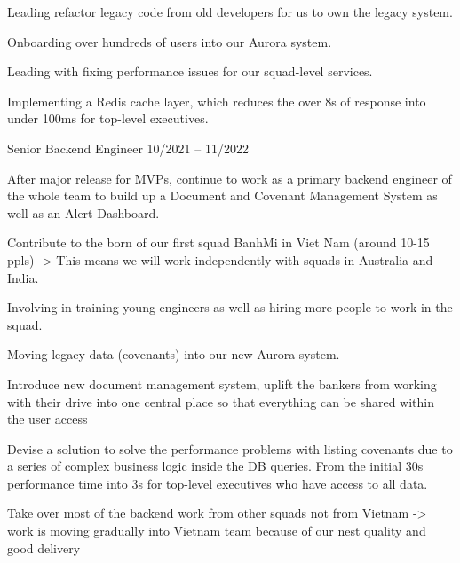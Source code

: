 \begin{cventries}
{\begin{cvitems}
            \item {Leading refactor legacy code from old developers for us to own the legacy system.}
            \item {Onboarding over hundreds of users into our Aurora system.}
            \item {Leading with fixing performance issues for our squad-level services.}
            \item {Implementing a Redis cache layer, which reduces the over 8s of response into under 100ms for top-level executives.}
        \end{cvitems}
    }

    
    \cventry
    {Senior Backend Engineer} %
    {} %
    {} %
    {10/2021 -- 11/2022} %
    {
        \begin{cvitems} %
            \item{After major release for MVPs, continue to work as a primary backend engineer of the whole team to build up a Document and Covenant Management System as well as an Alert Dashboard.}
            \item {Contribute to the born of our first squad BanhMi in Viet Nam (around 10-15 ppls) -> This means we will work independently with squads in Australia and India.}
            \item {Involving in training young engineers as well as hiring more people to work in the squad.}
            \item {Moving legacy data (covenants) into our new Aurora system.}
            \item {Introduce new document management system, uplift the bankers from working with their drive into one central place so that everything can be shared within the user access}
            \item {Devise a solution to solve the performance problems with listing covenants due to a series of complex business logic inside the DB queries. From the initial 30s performance time into 3s for top-level executives who have access to all data.}
            \item {Take over most of the backend work from other squads not from Vietnam -> work is moving gradually into Vietnam team because of our nest quality and good delivery}
        \end{cvitems}
    }


\end{cventries}
